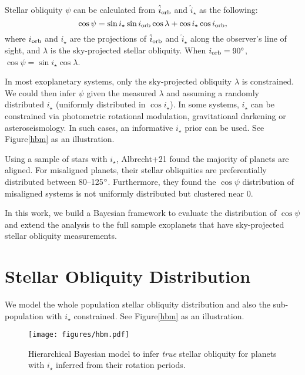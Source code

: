 \documentclass[twocolumn]{aastex631}
\begin{document}
Stellar obliquity $\psi$ can be calculated from $\hat{i}_{\rm orb}$ and $\hat{i}_{\star}$ as the following:
\begin{equation}
    \cos{\psi} = \sin{i_\star}\sin{i_{\rm orb}}\cos{\lambda} + \cos{i_\star}\cos{i_{\rm orb}},
\end{equation}
where $i_{\rm orb}$ and $i_\star$ are the projections of $\hat{i}_{\rm orb}$ and $\hat{i}_{\star}$ along the observer's line of sight, and $\lambda$ is the sky-projected stellar obliquity. When $i_{\rm orb} = 90\mbox{$^\circ$}$, $\cos{\psi} = \sin{i_\star}\cos{\lambda}$.

In most exoplanetary systems, only the sky-projected obliquity $\lambda$ is constrained. We could then infer $\psi$ given the measured $\lambda$ and assuming a randomly distributed $i_\star$ (uniformly distributed in $\cos{i_\star}$).
In some systems, $i_\star$ can be constrained via photometric rotational modulation, gravitational darkening or asteroseismology. In such cases, an informative $i_\star$ prior can be used. See Figure\ref{hbm} as an illustration. 

Using a sample of stars with $i_\star$, Albrecht+21 found the majority of planets are aligned. For misaligned planets, their stellar obliquities are preferentially distributed between 80--125$\mbox{$^\circ$}$. Furthermore, they found the $\cos{\psi}$ distribution of misaligned systems is not uniformly distributed but clustered near 0.

In this work, we build a Bayesian framework to evaluate the distribution of $\cos{\psi}$ and extend the analysis to the full sample exoplanets that have sky-projected stellar obliquity measurements.

\section{Stellar Obliquity Distribution} \label{sec:hbm}
We model the whole population stellar obliquity distribution and also the sub-population with $i_\star$ constrained. See Figure\ref{hbm} as an illustration. 

\begin{figure}[ht!]
    \begin{centering}
        \texttt{[image: figures/hbm.pdf]}
        \caption{Hierarchical Bayesian model to infer \emph{true} stellar obliquity for planets with $i_{\star}$ inferred from their rotation periods.}
        \label{fig:hbm}
    \end{centering}
\end{figure}
\end{document}
